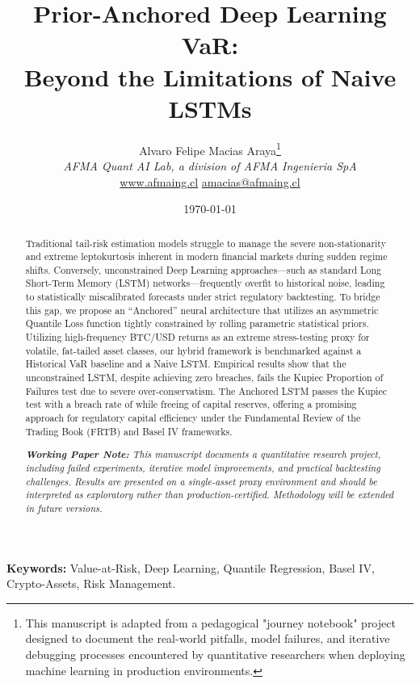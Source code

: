 \documentclass[12pt, a4paper]{article}
\title{\textbf{Prior-Anchored Deep Learning VaR:\\ Beyond the Limitations of Naive LSTMs}}
\author{
    Alvaro Felipe Macias Araya\thanks{This manuscript is adapted from a pedagogical "journey notebook" project designed to document the real-world pitfalls, model failures, and iterative debugging processes encountered by quantitative researchers when deploying machine learning in production environments.} \\
    \textit{AFMA Quant AI Lab, a division of AFMA Ingenieria SpA} \\
    \href{https://www.afmaing.cl}{www.afmaing.cl} \quad \textbar \quad \href{mailto:amacias@afmaing.cl}{amacias@afmaing.cl}
}
\date{\today}
\begin{document}
\maketitle

\begin{abstract}
    \noindent Traditional tail-risk estimation models struggle to manage the severe non-stationarity and extreme leptokurtosis inherent in modern financial markets during sudden regime shifts. Conversely, unconstrained Deep Learning approaches---such as standard Long Short-Term Memory (LSTM) networks---frequently overfit to historical noise, leading to statistically miscalibrated forecasts under strict regulatory backtesting. To bridge this gap, we propose an ``Anchored'' neural architecture that utilizes an asymmetric Quantile Loss function tightly constrained by rolling parametric statistical priors. Utilizing high-frequency BTC/USD returns as an extreme stress-testing proxy for volatile, fat-tailed asset classes, our hybrid framework is benchmarked against a Historical VaR baseline and a Naive LSTM. Empirical results show that the unconstrained LSTM, despite achieving zero breaches, fails the Kupiec Proportion of Failures test due to severe over-conservatism. The Anchored LSTM passes the Kupiec test with a breach rate of \anchoredBreachRate{} while freeing \capEfficiency{} of capital reserves, offering a promising approach for regulatory capital efficiency under the Fundamental Review of the Trading Book (FRTB) and Basel IV frameworks.

\vspace{0.5em}
\noindent\textit{\textbf{Working Paper Note:} This manuscript documents a quantitative research project, including failed experiments, iterative model improvements, and practical backtesting challenges. Results are presented on a single-asset proxy environment and should be interpreted as exploratory rather than production-certified. Methodology will be extended in future versions.}

\end{abstract}

\vspace{1em}
\textbf{Keywords:} Value-at-Risk, Deep Learning, Quantile Regression, Basel IV, Crypto-Assets, Risk Management.

\newpage
{} %

\end{document}

